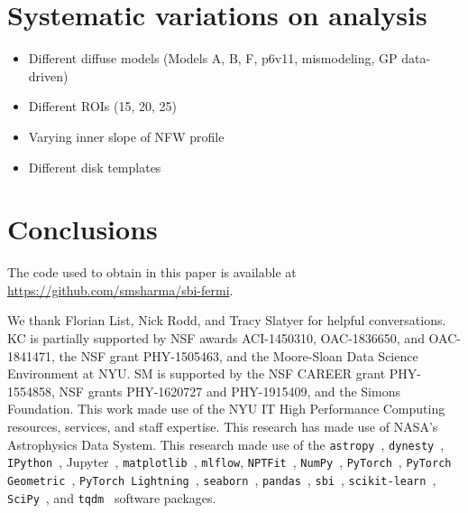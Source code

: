 \documentclass[prd,aps,10pt,nofootinbib,twocolumn,superscriptaddress,preprintnumbers,balancelastpage,longbibliography]{revtex4-1}
\begin{document}
\section{Systematic variations on analysis}
\label{sec:systematics}

\begin{itemize}
    \item Different diffuse models (Models A, B, F, p6v11, mismodeling, GP data-driven)
    \item Different ROIs (15, 20, 25)
    \item Varying inner slope of NFW profile
    \item Different disk templates
\end{itemize}

\section{Conclusions}
\label{sec:conclusion}

The code used to obtain in this paper is available at \url{https://github.com/smsharma/sbi-fermi}.

\vspace{.3cm}

\begin{acknowledgments}

We thank Florian List, Nick Rodd, and Tracy Slatyer for helpful conversations.  
KC is partially supported by NSF awards ACI-1450310, OAC-1836650, and OAC-1841471, the NSF grant PHY-1505463, and the Moore-Sloan Data Science Environment at NYU. 
SM is supported by the NSF CAREER grant PHY-1554858, NSF grants PHY-1620727 and PHY-1915409, and the Simons Foundation. 
This work made use of the NYU IT High Performance Computing resources, services, and staff expertise. 
This research has made use of NASA's Astrophysics Data System. 
This research made use of the \texttt{astropy}~\cite{Price-Whelan:2018hus,Robitaille:2013mpa}, \texttt{dynesty}~\cite{Speagle_2020}, \texttt{IPython}~\cite{PER-GRA:2007}, Jupyter~\cite{Kluyver2016JupyterN}, \texttt{matplotlib}~\cite{Hunter:2007}, \texttt{mlflow}, \texttt{NPTFit}~\cite{Mishra-Sharma:2016gis}, \texttt{NumPy}~\cite{numpy:2011}, \texttt{PyTorch}~\cite{NEURIPS2019_9015}, \texttt{PyTorch Geometric}~\cite{Fey/Lenssen/2019}, \texttt{PyTorch Lightning}~\cite{william_falcon_2020_3828935}, \texttt{seaborn}~\cite{seaborn}, \texttt{pandas}~\cite{pandas:2010}, \texttt{sbi}~\cite{tejero-cantero2020sbi}, \texttt{scikit-learn}~\cite{scikit-learn}, \texttt{SciPy}~\cite{2020SciPy-NMeth}, and \texttt{tqdm}~\cite{da2019tqdm}  software packages. 
\end{acknowledgments}





\end{document}
